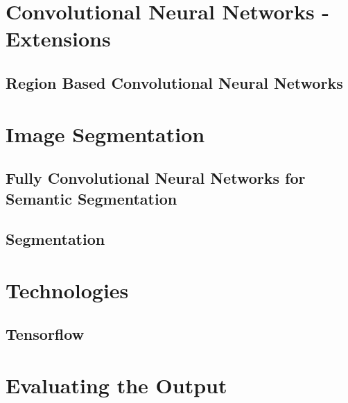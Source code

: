 \section{Convolutional Neural Networks - Extensions}
\subsection*{Region Based Convolutional Neural Networks}


\section{Image Segmentation}
\subsection*{Fully Convolutional Neural Networks for Semantic Segmentation}

\subsection*{Segmentation}


\section{Technologies}
\subsection*{Tensorflow}


\section{Evaluating the Output}


